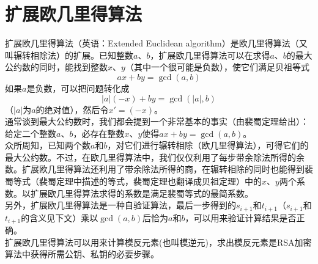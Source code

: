 \documentclass[UTF8]{ctexart}
\begin{document}
\section*{扩展欧几里得算法}
扩展欧几里得算法\cite{扩展欧几里得算法}（英语：Extended Euclidean algorithm）是欧几里得算法（又叫辗转相除法）的扩展。已知整数$a$、$b$，扩展欧几里得算法可以在求得$a$、$b$的最大公约数的同时，能找到整数$x$、$y$（其中一个很可能是负数），使它们满足贝祖等式
\[ ax + by = \gcd(a,b) \]
如果$a$是负数，可以把问题转化成
\[ |a|(-x) + by = \gcd(|a|,b) \]
（$|a|$为$a$的绝对值），然后令$x' = (-x)$。\\
通常谈到最大公约数时，我们都会提到一个非常基本的事实（由裴蜀定理给出）：给定二个整数$a$、$b$，必存在整数$x$、$y$使得$ax + by = \gcd(a,b)$。\\
众所周知，已知两个数$a$和$b$，对它们进行辗转相除（欧几里得算法），可得它们的最大公约数。不过，在欧几里得算法中，我们仅仅利用了每步带余除法所得的余数。扩展欧几里得算法还利用了带余除法所得的商，在辗转相除的同时也能得到裴蜀等式（裴蜀定理中描述的等式，裴蜀定理也翻译成贝祖定理）中的$x$、$y$两个系数。以扩展欧几里得算法求得的系数是满足裴蜀等式的最简系数。\\
另外，扩展欧几里得算法是一种自验证算法，最后一步得到的$s_{i+1}$和$t_{i+1}$（$s_{i+1}$和$t_{i+1}$的含义见下文）乘以$\gcd(a,b)$后恰为$a$和$b$，可以用来验证计算结果是否正确。\\
扩展欧几里得算法可以用来计算模反元素(也叫模逆元)，求出模反元素是RSA加密算法中获得所需公钥、私钥的必要步骤。
\end{document}

